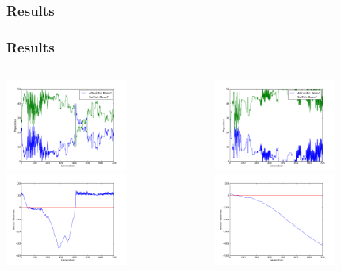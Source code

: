 \documentclass{beamer}
\begin{document}

      \subsubsection{Results} %
      \label{ssub:results}

        \begin{frame}[c]\frametitle{Results}
          \begin{columns}
          \begin{column}{0.48\textwidth}
            \includegraphics[width=4cm]{results/gossip_bees.png}
            \includegraphics[width=4cm]{results/gossip_bees_nectar.png}
          \end{column}
          \begin{column}{0.48\textwidth}
            \includegraphics[width=4cm]{results/gossip_bees_bad.png}
            \includegraphics[width=4cm]{results/gossip_bees_bad_nectar.png}
          \end{column}
          \end{columns}
        \end{frame}
\end{document}
